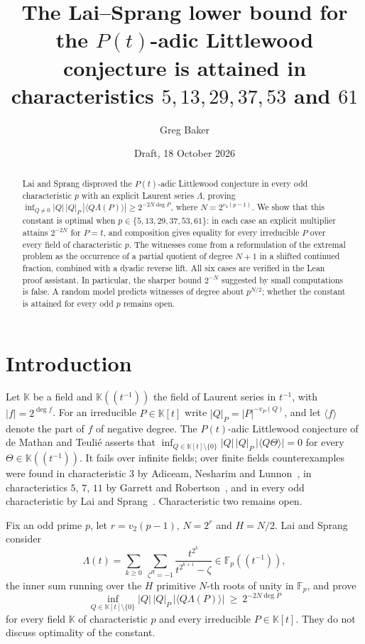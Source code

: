 \documentclass[11pt]{amsart}
\title[Sharpness of the Lai--Sprang bound]{The Lai--Sprang lower bound for the
$P(t)$-adic Littlewood conjecture is attained in characteristics
$5,13,29,37,53$ and $61$}
\author{Greg Baker}
\date{Draft, 18 October 2026}
\theoremstyle{definition}
\theoremstyle{remark}
\newcommand{\F}{\mathbb{F}}
\newcommand{\K}{\mathbb{K}}
\newcommand{\abs}[1]{\left|#1\right|}
\newcommand{\frp}[1]{\langle #1\rangle}
\begin{document}
\begin{abstract}
Lai and Sprang disproved the $P(t)$-adic Littlewood conjecture in every odd
characteristic $p$ with an explicit Laurent series $\Lambda$, proving
$\inf_{Q\neq0}\abs{Q}\,\abs{Q}_{P}\,\abs{\frp{Q\Lambda(P)}}\ge 2^{-2N\deg P}$,
where $N=2^{v_2(p-1)}$. We show that this constant is optimal when
$p\in\{5,13,29,37,53,61\}$: in each case an explicit multiplier attains
$2^{-2N}$ for $P=t$, and composition gives equality for every irreducible $P$
over every field of characteristic $p$. The witnesses come from a reformulation
of the extremal problem as the occurrence of a partial quotient of degree
$N+1$ in a shifted continued fraction, combined with a dyadic reverse lift.
All six cases are verified in the Lean proof assistant. In
particular, the sharper bound $2^{-N}$ suggested by small computations is
false. A random model predicts witnesses of degree about $p^{N/2}$; whether the
constant is attained for every odd $p$ remains open.
\end{abstract}

\maketitle

\section{Introduction}

Let $\K$ be a field and $\K((t^{-1}))$ the field of Laurent series in $t^{-1}$,
with $\abs{f}=2^{\deg f}$. For an irreducible $P\in\K[t]$ write
$\abs{Q}_P=\abs{P}^{-v_P(Q)}$, and let $\frp{f}$ denote the part of $f$ of
negative degree. The $P(t)$-adic Littlewood conjecture of de Mathan and
Teuli\'e asserts that
$\inf_{Q\in\K[t]\setminus\{0\}}\abs{Q}\,\abs{Q}_P\,\abs{\frp{Q\Theta}}=0$
for every $\Theta\in\K((t^{-1}))$. It fails over infinite fields; over finite
fields counterexamples were found in characteristic $3$ by Adiceam, Nesharim
and Lunnon~\cite{ANL}, in characteristics $5$, $7$, $11$ by Garrett and
Robertson~\cite{GR}, and in every odd characteristic by Lai and
Sprang~\cite{LS}. Characteristic two remains open.

Fix an odd prime $p$, let $r=v_2(p-1)$, $N=2^r$ and $H=N/2$. Lai and Sprang
consider
\[
\Lambda(t)=\sum_{k\ge0}\ \sum_{\zeta^{H}=-1}\frac{t^{2^k}}{t^{2^{k+1}}-\zeta}
\in\F_p((t^{-1})),
\]
the inner sum running over the $H$ primitive $N$-th roots of unity in $\F_p$,
and prove \cite[Theorem~1.2]{LS}
\begin{equation}\label{eq:LS}
\inf_{Q\in\K[t]\setminus\{0\}}\abs{Q}\,\abs{Q}_P\,\abs{\frp{Q\Lambda(P)}}
\ \ge\ 2^{-2N\deg P}
\end{equation}
for every field $\K$ of characteristic $p$ and every irreducible $P\in\K[t]$.
They do not discuss optimality of the constant.
\end{document}

